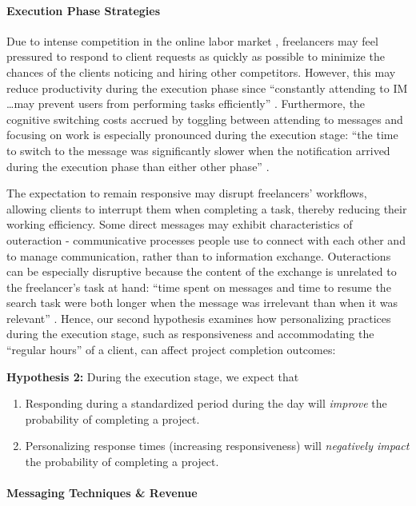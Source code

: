 \paragraph{Execution Phase Strategies}
Due to intense competition in the online labor market \cite{dunn2017digital}, freelancers may feel pressured to respond to client requests as quickly as possible to minimize the chances of the clients noticing and hiring other competitors. However, this may reduce productivity during the execution phase since ``constantly attending to IM \dots may prevent users from performing tasks efficiently'' \cite{Avrahami2004-cd}. Furthermore, the cognitive switching costs accrued by toggling between attending to messages and focusing on work is especially pronounced during the execution stage: ``the time to switch to the message was significantly slower when the notification arrived during the execution phase than either other phase'' \cite{Cutrell2000-ap}. 

The expectation to remain responsive may disrupt freelancers' workflows, allowing clients to interrupt them when completing a task, thereby reducing their working efficiency. Some direct messages may exhibit characteristics of outeraction - communicative processes people use to connect with each other and to manage communication, rather than to information exchange. Outeractions can be especially disruptive because the content of the exchange is unrelated to the freelancer's task at hand: ``time spent on messages and time to resume the search task were both longer when the message was irrelevant than when it was relevant'' \cite{Cutrell2000-ap}. Hence, our second hypothesis examines how personalizing practices during the execution stage, such as responsiveness and accommodating the ``regular hours'' of a client, can affect project completion outcomes:
\newline

\textbf{Hypothesis 2:} During the execution stage, we expect that
\begin{enumerate}
  \renewcommand{\labelenumi}{\alph{enumi}.}
    \item Responding during a standardized period during the day will \textit{improve} the probability of completing a project.
    \item Personalizing response times (increasing responsiveness) will \textit{negatively impact} the probability of completing a project. 
\end{enumerate}

\paragraph{Messaging Techniques \& Revenue}

